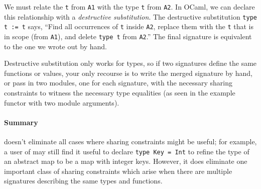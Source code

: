 \noindent
We must relate the \verb|t| from \verb|A1| with the type \verb|t| from
\verb|A2|. In OCaml, we can
declare this relationship with a \emph{destructive substitution}.
The destructive substitution \verb|type t := t| says, ``Find all occurrences
of \verb|t| inside \verb|A2|, replace them with the \verb|t| that is in
scope (from \verb|A1|), and delete \verb|type t| from \verb|A2|.''
The final signature is equivalent to the one we wrote out by hand.

Destructive substitution only works for types, so if two signatures
define the same functions or values, your only recourse is to write the
merged signature by hand, or pass in two modules, one for each signature,
with the necessary sharing constraints to witness the necessary type equalities
(as seen in the example functor with two module arguments).

\paragraph{Summary}
\Backpack{} doesn't eliminate all cases where sharing constraints might be
useful; for example, a user of \Backpack{} may still find it useful to
declare \verb|type Key = Int| to refine the type of an abstract map
to be a map with integer keys.  However, it does eliminate one important
class of sharing constraints which arise when there are multiple signatures
describing the same types and functions.



